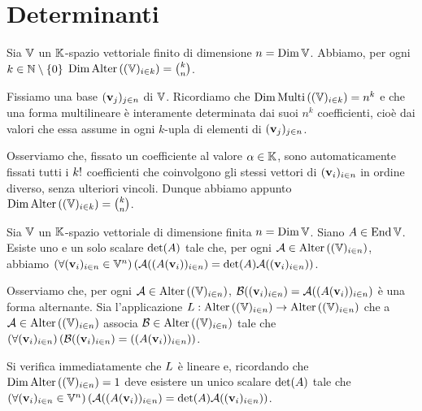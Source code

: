 \section{Determinanti}
\label{GeometriaLineare_Determinante}
\begin{Theorem}
	Sia $\mathbb{V}$ un $\mathbb{K}$-spazio vettoriale finito di dimensione $n = \operatorname{\operatorname{Dim}}{\mathbb{V}}$. Abbiamo, per ogni $k \in \mathbb{N} \setminus \lbrace 0 \rbrace$ $\operatorname{\operatorname{Dim}}{\text{Alter} \left ( (\mathbb{V})_{i \in k} \right )} = \binom{k}{n}$.
\end{Theorem}
\Proof Fissiamo una base $(\mathbf{v}_j)_{j \in n}$ di $\mathbb{V}$. Ricordiamo che $\operatorname{\operatorname{Dim}}{\text{Multi}\left ( (\mathbb{V})_{i \in k} \right )} = n^k$ e che una forma multilineare \`e interamente determinata dai suoi $n^k$ coefficienti, cio\`e dai valori che essa assume in ogni $k$-upla di elementi di $(\mathbf{v}_j)_{j \in n}$.
\par Osserviamo che, fissato un coefficiente al valore $\alpha \in \mathbb{K}$, sono automaticamente fissati tutti i $k !$ coefficienti che coinvolgono gli stessi vettori di $(\mathbf{v}_i)_{i \in n}$ in ordine diverso, senza ulteriori vincoli. Dunque abbiamo appunto $\operatorname{\operatorname{Dim}}{\text{Alter} \left ( (\mathbb{V})_{i \in k} \right )} = \binom{k}{n}$. \EndProof
\begin{Theorem}
	Sia $\mathbb{V}$ un $\mathbb{K}$-spazio vettoriale di dimensione finita
  $n = \operatorname{\operatorname{Dim}}{\mathbb{V}}$.
  Siano $A \in \operatorname{End}{\mathbb{V}}$.
  Esiste uno e un solo scalare
  $\operatorname{det}(A)$ tale che, per ogni
  $\mathcal{A} \in \text{Alter} \left ( (\mathbb{V})_{i \in n} \right )$,
  abbiamo
  $\left ( \forall (\mathbf{v}_i)_{i \in n} \in \mathbb{V}^n \right ) \left ( \mathcal{A}((A(\mathbf{v}_i))_{i \in n})
  =\operatorname{det}(A)\mathcal{A}((\mathbf{v}_i)_{i \in n}) \right )$.
\end{Theorem}
\Proof Osserviamo che, per ogni $\mathcal{A} \in \text{Alter} \left ( (\mathbb{V})_{i \in n} \right )$, $\mathcal{B}((\mathbf{v}_i)_{i \in n}) = \mathcal{A}((A(\mathbf{v}_i))_{i \in n})$ \`e una forma alternante. Sia l'applicazione $L: \text{Alter} \left ( (\mathbb{V})_{i \in n} \right ) \rightarrow \text{Alter} \left ( (\mathbb{V})_{i \in n} \right )$ che a $\mathcal{A} \in \text{Alter} \left ( (\mathbb{V})_{i \in n} \right )$ associa $\mathcal{B} \in \text{Alter} \left ( (\mathbb{V})_{i \in n} \right )$ tale che $\left ( \forall (\mathbf{v}_i)_{i \in n} \right ) \left ( \mathcal{B}((\mathbf{v}_i)_{i \in n}) = ((A(\mathbf{v}_i))_{i \in n}) \right )$. 
\par Si verifica immediatamente che $L$ \`e lineare e, ricordando che $\operatorname{\operatorname{Dim}}{\text{Alter} \left ( (\mathbb{V})_{i \in n} \right )} = 1$ deve esistere un unico scalare $\operatorname{det}(A)$ tale che $\left ( \forall (\mathbf{v}_i)_{i \in n} \in \mathbb{V}^n \right ) \left ( \mathcal{A}((A(\mathbf{v}_i))_{i \in n}) = \operatorname{det}(A)\mathcal{A}((\mathbf{v}_i)_{i \in n}) \right )$. \EndProof
